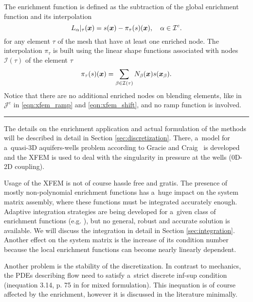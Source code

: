 The enrichment function is defined as the subtraction of the global enrichment function and its interpolation 
\begin{equation} \label{eqn:sgfem_enrich}
    L_{\alpha}|_{\tau}(\mathbf{\boldsymbol{x}}) = s(\mathbf{\boldsymbol{x}}) - \pi_\tau (s)(\mathbf{\boldsymbol{x}}),
    \quad \alpha\in\mathcal{I}^e.
\end{equation} 
for any element $\tau$ of the mesh that have at least one enriched node.
The interpolation $\pi_\tau$ is built using the linear shape functions
associated with nodes $\mathcal{I}(\tau)$ of the element $\tau$
\begin{equation} \label{eqn:sgfem_interpolation}
    \pi_\tau (s)(\mathbf{\boldsymbol{x}}) = \sum_{\beta\in\mathcal{I}(\tau)} N_\beta(\mathbf{\boldsymbol{x}}) s(\mathbf{\boldsymbol{x}}_\beta).
\end{equation}
Notice that there are no additional enriched nodes on blending elements, like in $\mathcal{J}^e$ in 
\eqref{eqn:xfem_ramp} and \eqref{eqn:xfem_shift}, and no ramp function is involved.





\par\noindent\rule{\textwidth}{1pt}

The details on the enrichment application and actual formulation of the methods will be described in detail in Section
\ref{sec:discretization}. There, a~model for a~quasi-3D aquifers-wells problem according to Gracie and Craig~\cite{gracie_modelling_2010,craig_using_2011}
is developed and the XFEM is used to deal with the singularity in pressure at the wells (0D-2D coupling).

Usage of the XFEM is not of course hassle free and gratis. The presence of mostly non-polynomial enrichment functions
has a~huge impact on the system matrix assembly, where these functions must be integrated accurately enough.
Adaptive integration strategies are being developed for a~given class of enrichment functions (e.g. \cite{ventura_fast_2009}), 
but no general, robust and accurate solution is available. We will discuss the integration in detail in Section \ref{sec:integration}.
Another effect on the system matrix is the increase of its condition number because the local enrichment functions can
become nearly linearly dependent. 

Another problem is the stability of the discretization. In contrast to mechanics, the PDEs describing flow
need to satisfy a~strict discrete inf-sup condition (inequation 3.14, p. 75 in \cite{brezzi_mixed_1991} for mixed formulation).
This inequation is of course affected by the enrichment, however it is discussed in the literature minimally.


